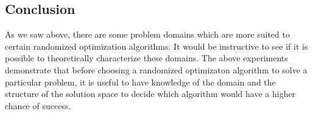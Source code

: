 \documentclass[letterpaper]{article}
\begin{document}
	\subsection{Conclusion}
	As we saw above, there are some problem domains which are more suited to certain randomized optimization algorithms. It would be instructive to see if it is possible to theoretically characterize these domains. The above experiments demonstrate that before choosing a randomized optimizaton algorithm to solve a particular problem, it is useful to have knowledge of the domain and the structure of the solution space to decide which algorithm would have a higher chance of success.
	
	
	
	
\end{document}
